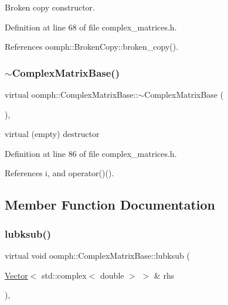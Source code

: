 Broken copy constructor. 



Definition at line 68 of file complex\+\_\+matrices.\+h.



References oomph\+::\+Broken\+Copy\+::broken\+\_\+copy().

\mbox{\label{classoomph_1_1ComplexMatrixBase_a5b6bb3011ea7b08dead73e943fd74b15}} 
\subsubsection{\texorpdfstring{$\sim$\+Complex\+Matrix\+Base()}{~ComplexMatrixBase()}}
{\footnotesize\ttfamily virtual oomph\+::\+Complex\+Matrix\+Base\+::$\sim$\+Complex\+Matrix\+Base (\begin{DoxyParamCaption}{ }\end{DoxyParamCaption})\hspace{0.3cm}{\ttfamily [inline]}, {\ttfamily [virtual]}}



virtual (empty) destructor 



Definition at line 86 of file complex\+\_\+matrices.\+h.



References i, and operator()().



\subsection{Member Function Documentation}
\mbox{\label{classoomph_1_1ComplexMatrixBase_aa0e444d60d4ec9e35a6903ab88baaf62}} 
\subsubsection{\texorpdfstring{lubksub()}{lubksub()}}
{\footnotesize\ttfamily virtual void oomph\+::\+Complex\+Matrix\+Base\+::lubksub (\begin{DoxyParamCaption}\item[{\hyperlink{classoomph_1_1Vector}{Vector}$<$ std\+::complex$<$ double $>$ $>$ \&}]{rhs }\end{DoxyParamCaption})\hspace{0.3cm}{\ttfamily [inline]}, {\ttfamily [virtual]}}



